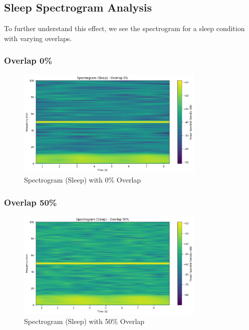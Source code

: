 \documentclass[10pt]{article}
\theoremstyle{definition}
\theoremstyle{remark}
\theoremstyle{definition}
\numberwithin{equation}{prob}
\begin{document}
\subsection{Sleep Spectrogram Analysis}

To further understand this effect, we see the spectrogram for a sleep condition with varying overlaps.

\subsubsection{Overlap 0\%}
\begin{figure}[H]
    \centering
    \includegraphics[width=0.8\textwidth]{./figures/Spectrogram Sleep Overlap 0.png}
    \caption{Spectrogram (Sleep) with 0\% Overlap}
    \label{fig:sleep_0_overlap}
\end{figure}

\subsubsection{Overlap 50\%}
\begin{figure}[H]
    \centering
    \includegraphics[width=0.8\textwidth]{./figures/Spectrogram Sleep Overlap 50.png}
    \caption{Spectrogram (Sleep) with 50\% Overlap}
    \label{fig:sleep_50_overlap}
\end{figure}
\end{document}
